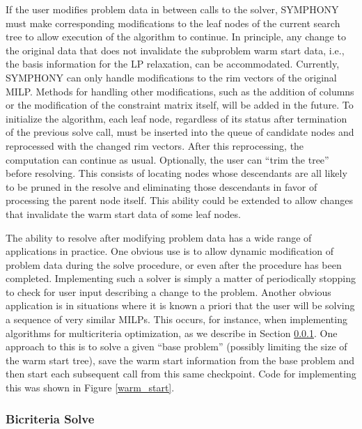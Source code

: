 If the user modifies problem data in between calls to the solver, SYMPHONY
must make corresponding modifications to the leaf nodes of the current search
tree to allow execution of the algorithm to continue. In principle, any change
to the original data that does not invalidate the subproblem warm start data,
i.e., the basis information for the LP relaxation, can be
accommodated. Currently, SYMPHONY can only handle modifications to the rim
vectors of the original MILP. Methods for handling other modifications, such as
the addition of columns or the modification of the constraint matrix itself,
will be added in the future. To initialize the algorithm, each leaf node,
regardless of its status after termination of the previous solve call, must be
inserted into the queue of candidate nodes and reprocessed with the changed
rim vectors. After this reprocessing, the computation can continue as usual.
Optionally, the user can ``trim the tree'' before resolving. This consists of
locating nodes whose descendants are all likely to be pruned in the resolve
and eliminating those descendants in favor of processing the parent node
itself. This ability could be extended to allow changes that invalidate the
warm start data of some leaf nodes.

The ability to resolve after modifying problem data has a wide range of
applications in practice. One obvious use is to allow dynamic modification of
problem data during the solve procedure, or even after the procedure has been
completed. Implementing such a solver is simply a matter of periodically
stopping to check for user input describing a change to the problem. Another
obvious application is in situations where it is known a priori that the user
will be solving a sequence of very similar MILPs. This occurs, for instance,
when implementing algorithms for multicriteria optimization, as we describe in
Section \ref{mc_solve}. One approach to this is to solve a given ``base
problem'' (possibly limiting the size of the warm start tree), save the warm
start information from the base problem and then start each subsequent call
from this same checkpoint. Code for implementing this was shown in Figure
\ref{warm_start}. 

\subsubsection{Bicriteria Solve}\label{mc_solve}

